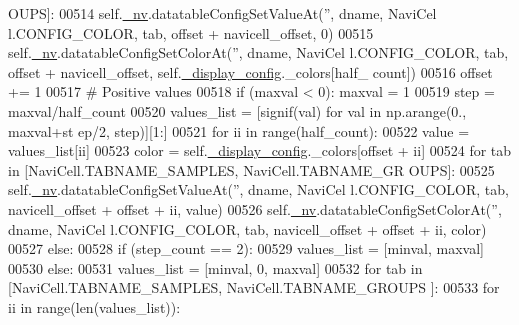 \begin{DoxyCode}
      OUPS]:
00514                             self.\hyperlink{classnavicom_1_1navicom_1_1NaviCom_afff3fd56fa16a68bab52ba8d801e325a}{_nv}.datatableConfigSetValueAt(\textcolor{stringliteral}{''}, dname, NaviCel
      l.CONFIG\_COLOR, tab, offset + navicell\_offset, 0)
00515                             self.\hyperlink{classnavicom_1_1navicom_1_1NaviCom_afff3fd56fa16a68bab52ba8d801e325a}{_nv}.datatableConfigSetColorAt(\textcolor{stringliteral}{''}, dname, NaviCel
      l.CONFIG\_COLOR, tab, offset + navicell\_offset, self.\hyperlink{classnavicom_1_1navicom_1_1NaviCom_ab8ddca454f674629472d8bfec46ac76f}{_display_config}.\_colors[half\_
      count])
00516                         offset += 1
00517                     \textcolor{comment}{# Positive values}
00518                     \textcolor{keywordflow}{if} (maxval < 0): maxval = 1
00519                     step = maxval/half\_count
00520                     values\_list = [signif(val) \textcolor{keywordflow}{for} val \textcolor{keywordflow}{in} np.arange(0., maxval+st
      ep/2, step)][1:]
00521                     \textcolor{keywordflow}{for} ii \textcolor{keywordflow}{in} range(half\_count):
00522                         value = values\_list[ii]
00523                         color = self.\hyperlink{classnavicom_1_1navicom_1_1NaviCom_ab8ddca454f674629472d8bfec46ac76f}{_display_config}.\_colors[offset + ii]
00524                         \textcolor{keywordflow}{for} tab \textcolor{keywordflow}{in} [NaviCell.TABNAME\_SAMPLES, NaviCell.TABNAME\_GR
      OUPS]:
00525                             self.\hyperlink{classnavicom_1_1navicom_1_1NaviCom_afff3fd56fa16a68bab52ba8d801e325a}{_nv}.datatableConfigSetValueAt(\textcolor{stringliteral}{''}, dname, NaviCel
      l.CONFIG\_COLOR, tab, navicell\_offset + offset + ii, value)
00526                             self.\hyperlink{classnavicom_1_1navicom_1_1NaviCom_afff3fd56fa16a68bab52ba8d801e325a}{_nv}.datatableConfigSetColorAt(\textcolor{stringliteral}{''}, dname, NaviCel
      l.CONFIG\_COLOR, tab, navicell\_offset + offset + ii, color)
00527                 \textcolor{keywordflow}{else}:
00528                     \textcolor{keywordflow}{if} (step\_count == 2):
00529                         values\_list = [minval, maxval]
00530                     \textcolor{keywordflow}{else}:
00531                         values\_list = [minval, 0, maxval]
00532                     \textcolor{keywordflow}{for} tab \textcolor{keywordflow}{in} [NaviCell.TABNAME\_SAMPLES, NaviCell.TABNAME\_GROUPS
      ]:
00533                         \textcolor{keywordflow}{for} ii \textcolor{keywordflow}{in} range(len(values\_list)):

\end{DoxyCode}

